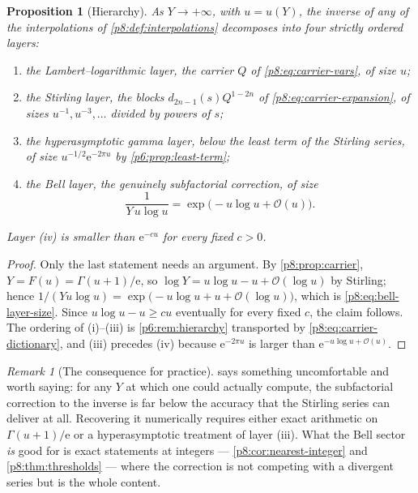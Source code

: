 \documentclass[11pt,a4paper,oneside]{book}
\theoremstyle{plain}
\newtheorem{proposition}[theorem]{Proposition}
\theoremstyle{definition}
\theoremstyle{remark}
\newtheorem{remark}[theorem]{Remark}
\newcommand{\e}{\mathrm{e}}
\newcommand{\bigO}{\mathcal{O}}
\begin{document}
\begin{proposition}[Hierarchy]\label{p8:prop:hierarchy}
As $Y\to+\infty$, with $u=u(Y)$, the inverse of any of the interpolations of
\cref{p8:def:interpolations} decomposes into four strictly ordered layers:
\begin{enumerate}
\item the \emph{Lambert--logarithmic} layer, the carrier $Q$ of
\eqref{p8:eq:carrier-vars}, of size $u$;
\item the \emph{Stirling} layer, the blocks $d_{2n-1}(s)Q^{1-2n}$ of
\eqref{p8:eq:carrier-expansion}, of sizes $u^{-1},u^{-3},\dots$ divided by
powers of $s$;
\item the \emph{hyperasymptotic gamma} layer, below the least term of the
Stirling series, of size $u^{-1/2}\e^{-2\pi u}$ by
\cref{p6:prop:least-term};
\item the \emph{Bell} layer, the genuinely subfactorial correction, of size
\begin{equation}\label{p8:eq:bell-layer-size}
 \frac1{Y\,u\log u}=\exp\bigl(-u\log u+\bigO(u)\bigr).
\end{equation}
\end{enumerate}
Layer \textup{(iv)} is smaller than $\e^{-cu}$ for every fixed $c>0$.
\end{proposition}

\begin{proof}
Only the last statement needs an argument.  By
\cref{p8:prop:carrier}, $Y=F(u)=\Gamma(u+1)/\e$, so
$\log Y=u\log u-u+\bigO(\log u)$ by Stirling; hence
$1/(Y u\log u)=\exp\bigl(-u\log u+u+\bigO(\log u)\bigr)$, which is
\eqref{p8:eq:bell-layer-size}.  Since $u\log u-u\ge cu$ eventually for every
fixed $c$, the claim follows.  The ordering of (i)--(iii) is
\cref{p6:rem:hierarchy} transported by \eqref{p8:eq:carrier-dictionary}, and
(iii) precedes (iv) because $\e^{-2\pi u}$ is larger than
$\e^{-u\log u+\bigO(u)}$.
\end{proof}

\begin{remark}[The consequence for practice]\label{p8:rem:practice}
 says something uncomfortable and worth saying: for
any $Y$ at which one could actually compute, the subfactorial correction to
the inverse is far below the accuracy that the Stirling series can deliver at
all.  Recovering it numerically requires either exact arithmetic on
$\Gamma(u+1)/\e$ or a hyperasymptotic treatment of layer (iii).  What the
Bell sector \emph{is} good for is exact statements at integers ---
\cref{p8:cor:nearest-integer} and \cref{p8:thm:thresholds} --- where the
correction is not competing with a divergent series but is the whole content.
\end{remark}
\end{document}
